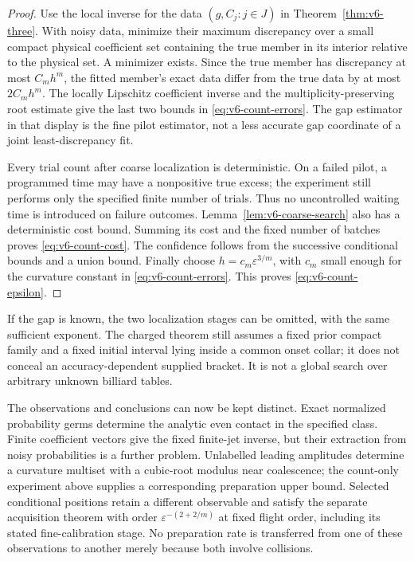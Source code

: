 \begin{proof}
Use the local inverse for the data $(g,C_j:j\in J)$ in
Theorem~\ref{thm:v6-three}. With noisy data, minimize their maximum
discrepancy over a small compact physical coefficient set containing
the true member in its interior relative to the physical set. A
minimizer exists. Since the true member has discrepancy at most
$C_mh^m$, the fitted member's exact data differ from the true data by
at most $2C_mh^m$. The locally Lipschitz coefficient inverse and the
multiplicity-preserving root estimate give the last two bounds in
\eqref{eq:v6-count-errors}. The gap estimator in that display is the
fine pilot estimator, not a less accurate gap coordinate of a joint
least-discrepancy fit.

Every trial count after coarse localization is deterministic. On a
failed pilot, a programmed time may have a nonpositive true excess;
the experiment still performs only the specified finite number of
trials. Thus no uncontrolled waiting time is introduced on failure
outcomes. Lemma~\ref{lem:v6-coarse-search} also has a deterministic
cost bound. Summing its cost and the fixed number of batches proves
\eqref{eq:v6-count-cost}. The confidence follows from the successive
conditional bounds and a union bound. Finally choose
$h=c_m\varepsilon^{3/m}$, with $c_m$ small enough for the curvature
constant in \eqref{eq:v6-count-errors}. This proves
\eqref{eq:v6-count-epsilon}.
\end{proof}

If the gap is known, the two localization stages can be omitted, with
the same sufficient exponent. The charged theorem still assumes a fixed
prior compact family and a fixed initial interval lying inside a common
onset collar; it does not conceal an accuracy-dependent supplied bracket.
It is not a global search over arbitrary unknown billiard tables.

The observations and conclusions can now be kept distinct. Exact
normalized probability germs determine the analytic even contact in the
specified class. Finite coefficient vectors give the fixed finite-jet
inverse, but their extraction from noisy probabilities is a further
problem. Unlabelled leading amplitudes determine a curvature multiset
with a cubic-root modulus near coalescence; the count-only experiment
above supplies a corresponding preparation upper bound. Selected
conditional positions retain a different observable and satisfy the
separate acquisition theorem with order
$\varepsilon^{-(2+2/m)}$ at fixed flight order, including its stated
fine-calibration stage. No preparation rate is transferred from one of
these observations to another merely because both involve collisions.
